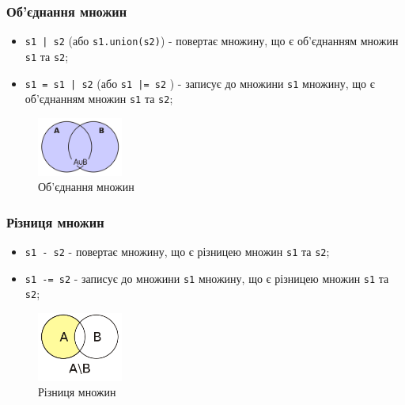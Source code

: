 \begin{frame}
\frametitle{Об'єднання множин}
\begin{itemize}
    \item \texttt{s1 | s2} (або \texttt{s1.union(s2)}) - повертає множину, що є об'єднанням множин \texttt{s1} та \texttt{s2};
  \item \texttt{s1 = s1 | s2} (або \texttt{s1 |= s2} ) - записує до множини \texttt{s1} множину, що є об'єднанням множин \texttt{s1} та \texttt{s2};
\end{itemize}
 \begin{figure}
\begin{center}
 \includegraphics[width=0.25\textwidth]{pictures/union.png}
\caption{Об'єднання множин}
\label{union} 
\end{center}
\end{figure} 
\end{frame}

\begin{frame}
\frametitle{Різниця множин}
\begin{itemize}
    \item \texttt{s1 - s2} - повертає множину, що є різницею множин \texttt{s1} та \texttt{s2};
  \item \texttt{s1 -= s2} - записує до множини \texttt{s1} множину, що є різницею множин \texttt{s1} та \texttt{s2};
\end{itemize}
 \begin{figure}
\begin{center}
 \includegraphics[width=0.25\textwidth]{pictures/subtract.png}
\caption{Різниця множин}
\label{subtract} 
\end{center}
\end{figure} 
\end{frame}

